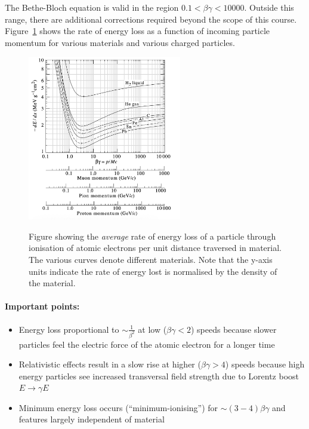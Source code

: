The Bethe-Bloch equation is valid in the region $0.1<\beta\gamma<10000$. Outside this range, there are additional corrections required beyond the scope of this course. Figure~\ref{fig:dedx} shows the rate of energy loss as a function of incoming particle momentum for various materials and various charged particles. 
\begin{figure}
\centering
\includegraphics[width=0.6\textwidth]{fig/detector/dedx_distribution.png}\\
\caption{Figure showing the \textit{average} rate of energy loss of a particle through ionisation of atomic electrons per unit distance traversed in material. The various curves denote different materials. Note that the y-axis units indicate the rate of energy lost is normalised by the density of the material.\label{fig:dedx}}
\end{figure}

\paragraph{Important points:}
\begin{itemize}
\item Energy loss proportional to $\sim\frac{1}{\beta^2}$ at low ($\beta\gamma<2$) speeds because slower particles feel the electric force of the atomic electron for a longer time
\item Relativistic effects result in a slow rise at higher ($\beta\gamma>4$) speeds because high energy particles see increased transversal field strength due to Lorentz boost $E\to \gamma E$
\item Minimum energy loss occurs (``minimum-ionising'') for $\sim (3-4)\beta\gamma$ and features largely independent of material
\end{itemize}

